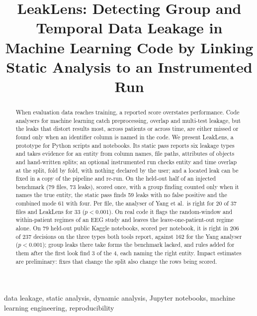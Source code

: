 \documentclass[conference]{IEEEtran}
\newcommand{\tool}{LeakLens}
\begin{document}
\title{LeakLens: Detecting Group and Temporal Data Leakage in Machine Learning Code by Linking Static Analysis to an Instrumented Run}

\author{
}

\maketitle

\begin{abstract}
When evaluation data reaches training, a reported score overstates performance. Code analysers for machine learning catch preprocessing, overlap and multi-test leakage, but the leaks that
distort results most, across patients or across time, are either missed or found only when an identifier column
is named in the code. We present \tool{}, a prototype for Python scripts and notebooks. Its static pass reports
six leakage types and takes evidence for an entity from column names, file paths, attributes of objects and
hand-written splits; an optional instrumented run checks entity and time overlap at the split, fold by fold,
with nothing declared by the user; and a located leak can be fixed in a copy of the pipeline and re-run. On the
held-out half of an injected benchmark (79 files, 73 leaks), scored once, with a group finding counted only when
it names the true entity, the static pass finds 59 leaks with no false positive and the combined mode 61 with
four. Per file, the analyser of Yang et al.\ is right for 20 of 37 files and \tool{} for 33 ($p<0.001$). On real
code it flags the random-window and within-patient regimes of an EEG study and leaves the leave-one-patient-out
regime alone. On 79 held-out public Kaggle notebooks, scored per notebook, it is right in 206 of 237 decisions on
the three types both tools report, against 162 for the Yang analyser ($p<0.001$); group leaks there take forms the
benchmark lacked, and rules added for them after the first look find 3 of the 4, each naming the right entity. Impact estimates are preliminary: fixes that change the split also change the rows
being scored.
\end{abstract}

\begin{IEEEkeywords}
data leakage, static analysis, dynamic analysis, Jupyter notebooks, machine learning
engineering, reproducibility
\end{IEEEkeywords}
\end{document}
